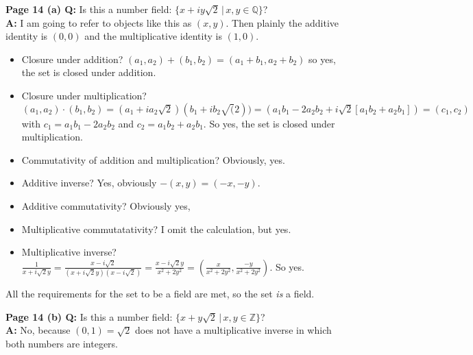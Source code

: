 \documentclass[a4paper,11pt]{article}
\numberwithin{equation}{section}
\begin{document}
{\bf Page 14 (a) Q:} Is this a number field: 
$\{ x+iy\sqrt{2} \, | \, x,y \in \mathbb{Q} \}$? \\
{\bf A:} I am going to refer to objects like this as $(x,y)$.
Then plainly the additive identity is $(0,0)$ and the multiplicative identity is
$(1,0)$.
\begin{itemize}
    \item Closure under addition? 
    $(a_1,a_2)+(b_1,b_2) =
    (a_1+b_1, a_2+b_2)$
    so yes, the set is closed under addition.
    \item Closure under multiplication?
    $(a_1,a_2)\cdot(b_1,b_2) = (a_1+i a_2 \sqrt{2})(b_1+i b_2 \sqrt(2))
    =
    (a_1 b_1 - 2 a_2 b_2 + i \sqrt{2} [a_1 b_2 + a_2 b_1])
    =
    (c_1, c_2)$
    with $c_1 = a_1 b_1 - 2 a_2 b_2$ and $c_2 = a_1 b_2 + a_2 b_1$.
    So yes, the set is closed under multiplication.
    \item Commutativity of addition and multiplication? Obviously, yes.
    \item Additive inverse? Yes, obviously $-(x,y) = (-x,-y)$.
    \item Additive commutativity? Obviously yes,
    \item Multiplicative commutatativity? I omit the calculation, but yes.
    \item Multiplicative inverse?
    $\frac{1}{x+i\sqrt{2}y} = \frac{x-i\sqrt{2}}{(x+i\sqrt{2}y)(x-i\sqrt{2})}
    = \frac{x-i\sqrt{2}y}{x^2 + 2 y^2} = 
    \left(\frac{x}{x^2 + 2y^2}, \frac{-y}{x^2 + 2 y^2}\right)$.
    So yes.
\end{itemize}
All the requirements for the set to be a field are met, so the set {\em is}
a field.

{\bf Page 14 (b) Q:} Is this a number field: 
$\{ x + y \sqrt{2} \, | \, x, y \in \mathbb{Z} \}$? \\
{\bf A:} No, because $(0,1) = \sqrt{2}$ does not have a multiplicative inverse
in which  both numbers are integers.
\end{document}
